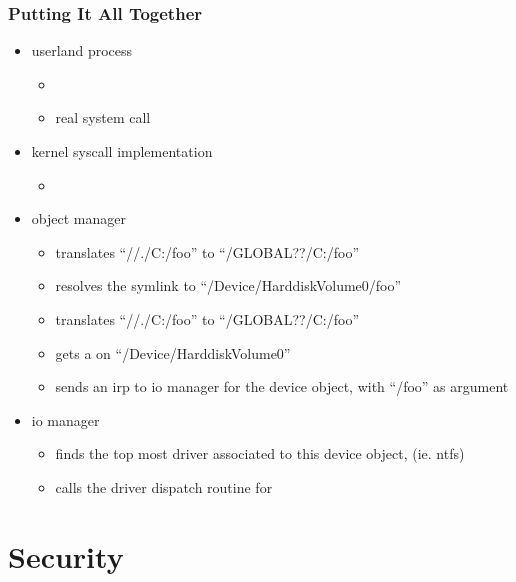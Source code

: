 \begin{frame}
  \frametitle{Putting It All Together}

  \begin{itemize}
    \item
      userland process
      \begin{itemize}
        \item
        \item
          real system call 
      \end{itemize}

    \item
      kernel syscall implementation
      \begin{itemize}
        \item
      \end{itemize}

    \item
      object manager
      \begin{itemize}
        \item
          translates ``//./C:/foo'' to ``/GLOBAL??/C:/foo''
        \item
          resolves the symlink to ``/Device/HarddiskVolume0/foo''
        \item
          translates ``//./C:/foo'' to ``/GLOBAL??/C:/foo''
        \item
          gets a  on ``/Device/HarddiskVolume0''
        \item
          sends an  irp to io manager for the device object,  with ``/foo'' as argument
      \end{itemize}

    \item
      io manager
      \begin{itemize}
        \item
          finds the top most driver associated to this device object, (ie. ntfs)
        \item
          calls the driver dispatch routine for 
      \end{itemize}

  \end{itemize}

\end{frame}

%
%

\section{Security}


